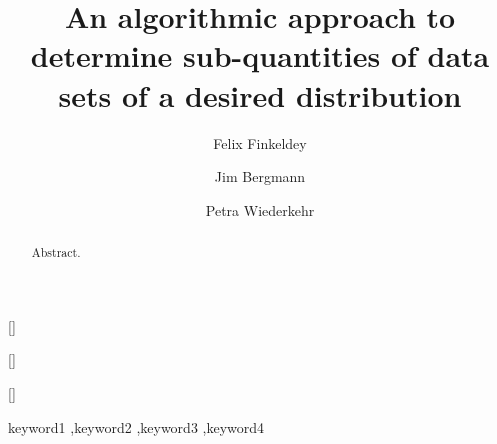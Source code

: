 \documentclass[a4paper,fleqn]{cas-dc}
\begin{document}
\let\WriteBookmarks\relax
\def\floatpagepagefraction{1}
\def\textpagefraction{.001}
\shorttitle{}

\title [mode = title]{An algorithmic approach to determine sub-quantities of data sets of a desired distribution}                      



\author[1]{Felix Finkeldey}[]
\cormark[1]

\address[1]{Virtual Machining, Chair for Software Engineering, TU Dortmund University, 44227 Dortmund, Germany}

\author[1]{Jim Bergmann}[]

\author[1]{Petra Wiederkehr}[]


\begin{abstract}
  Abstract.
\end{abstract}

\begin{keywords}
  keyword1 \sep keyword2 \sep keyword3 \sep keyword4
\end{keywords}

\maketitle

% 
% 
% 
\end{document}
